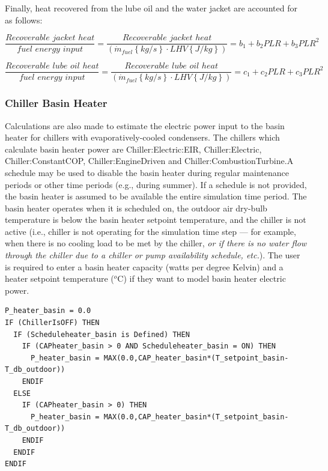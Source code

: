 Finally, heat recovered from the lube oil and the water jacket are accounted for as follows:

\begin{equation}
\frac{{Recoverable\,\,jacket\,\,heat}}{{fuel\,\,energy\,\,input}} = \frac{{Recoverable\,\,jacket\,\,heat}}{{\left( {{{\dot m}_{fuel}}\left\{ {kg/s} \right\} \cdot LHV\left\{ {J/kg} \right\}} \right)}} = {b_1} + {b_2}PLR + {b_3}PL{R^2}
\end{equation}

\begin{equation}
\frac{{Recoverable\,\,lube\,\,oil\,\,heat}}{{fuel\,\,energy\,\,input}} = \frac{{Recoverable\,\,lube\,\,oil\,\,heat}}{{\left( {{{\dot m}_{fuel}}\left\{ {kg/s} \right\} \cdot LHV\left\{ {J/kg} \right\}} \right)}} = {c_1} + {c_2}PLR + {c_3}PL{R^2}
\end{equation}

\subsubsection{Chiller Basin Heater}\label{chiller-basin-heater-3}

Calculations are also made to estimate the electric power input to the basin heater for chillers with evaporatively-cooled condensers. The chillers which calculate basin heater power are Chiller:Electric:EIR, Chiller:Electric, Chiller:ConstantCOP, Chiller:EngineDriven and Chiller:CombustionTurbine.A schedule may be used to disable the basin heater during regular maintenance periods or other time periods (e.g., during summer). If a schedule is not provided, the basin heater is assumed to be available the entire simulation time period. The basin heater operates when it is scheduled on, the outdoor air dry-bulb temperature is below the basin heater setpoint temperature, and the chiller is not active (i.e., chiller is not operating for the simulation time step --- for example, when there is no cooling load to be met by the chiller, \emph{or if there is no water flow through the chiller due to a chiller or pump availability schedule, etc.}). The user is required to enter a basin heater capacity (watts per degree Kelvin) and a heater setpoint temperature (\(^{o}\)C) if they want to model basin heater electric power.

\begin{lstlisting}
P_heater_basin = 0.0
IF (ChillerIsOFF) THEN
  IF (Scheduleheater_basin is Defined) THEN
    IF (CAPheater_basin > 0 AND Scheduleheater_basin = ON) THEN
      P_heater_basin = MAX(0.0,CAP_heater_basin*(T_setpoint_basin-T_db_outdoor))
    ENDIF
  ELSE
    IF (CAPheater_basin > 0) THEN
      P_heater_basin = MAX(0.0,CAP_heater_basin*(T_setpoint_basin-T_db_outdoor))
    ENDIF
  ENDIF
ENDIF
\end{lstlisting}

